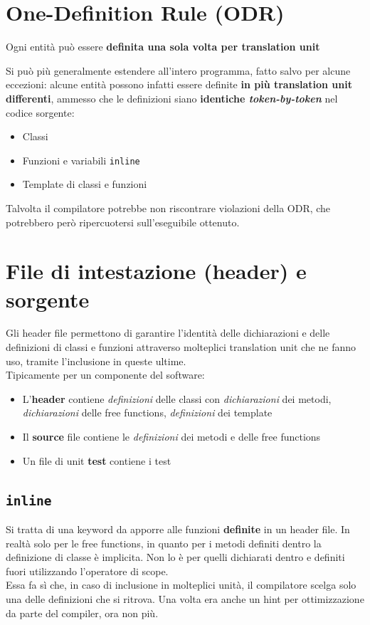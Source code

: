 \documentclass[10pt, oneside]{book}
\begin{document}
\section{One-Definition Rule (ODR)}
\begin{center}Ogni entità può essere \textbf{definita una sola volta per translation unit}\end{center}
Si può più generalmente estendere all'intero programma, fatto salvo per alcune eccezioni: alcune entità possono infatti essere definite \textbf{in più translation unit differenti}, ammesso che le definizioni siano \textbf{identiche \textit{token-by-token}} nel codice sorgente:
\begin{itemize}
\item Classi
\item Funzioni e variabili \texttt{inline}
\item Template di classi e funzioni
\end{itemize}
Talvolta il compilatore potrebbe non riscontrare violazioni della ODR, che potrebbero però ripercuotersi sull'eseguibile ottenuto.

\section{File di intestazione (header) e sorgente}
Gli header file permettono di garantire l'identità delle dichiarazioni e delle definizioni di classi e funzioni attraverso molteplici translation unit che ne fanno uso, tramite l'inclusione in queste ultime.\\
Tipicamente per un componente del software:
\begin{itemize}
\item L'\textbf{header} contiene \textit{definizioni} delle classi con \textit{dichiarazioni} dei metodi, \textit{dichiarazioni} delle free functions, \textit{definizioni} dei template
\item Il \textbf{source} file contiene le \textit{definizioni} dei metodi e delle free functions
\item Un file di unit \textbf{test} contiene i test
\end{itemize}

\subsection{\texttt{inline}}
Si tratta di una keyword da apporre alle funzioni \textbf{definite} in un header file. In realtà solo per le free functions, in quanto per i metodi definiti dentro la definizione di classe è implicita. Non lo è per quelli dichiarati dentro e definiti fuori utilizzando l'operatore di scope.\\
Essa fa sì che, in caso di inclusione in molteplici unità, il compilatore scelga solo una delle definizioni che si ritrova. Una volta era anche un hint per ottimizzazione da parte del compiler, ora non più.
\end{document}
